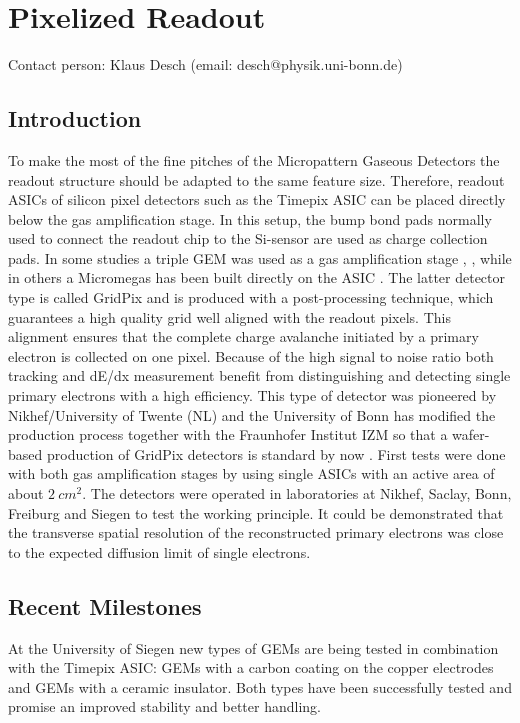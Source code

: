 \section{Pixelized Readout}\label{chap:TPC_sec:pixels}
Contact person: Klaus Desch (email: desch@physik.uni-bonn.de)\\

\subsection{Introduction}
To make the most of the fine pitches of the Micropattern Gaseous Detectors the
readout structure should be adapted to the same feature size. Therefore,
readout ASICs of silicon pixel detectors such as the Timepix ASIC
\cite{Llopart2007485,Llopart2008106} can be placed directly below the gas amplification
stage. In this setup, the bump bond pads normally used to connect the readout
chip to the Si-sensor are used as charge collection pads. In some studies a
triple GEM was used as a gas amplification stage \cite{Bamberger:2006xp},
\cite{6359808}, while in others a Micromegas has been built
directly on the ASIC \cite{Chefdeville2006490}. The latter detector type is
 called GridPix and is produced with a post-processing technique, which
 guarantees a high quality grid well aligned with the readout pixels. This
 alignment ensures that the complete charge avalanche initiated by a primary
 electron is collected on one pixel. Because of the high signal to noise
 ratio both tracking and dE/dx measurement benefit from distinguishing and
 detecting single primary electrons with a high efficiency. This type of
 detector was pioneered by Nikhef/University of Twente (NL) and the University
 of Bonn has modified the
 production process together with the Fraunhofer Institut IZM so that a
 wafer-based production of GridPix detectors is standard by now
 \cite{Koppert2013245}. First tests were done with both
 gas amplification stages by using single ASICs with an active area of about $\SI{2}{cm^2}$. The detectors were operated in laboratories at Nikhef, Saclay, Bonn,
 Freiburg and Siegen to test the working principle. It could be demonstrated
 that the transverse spatial resolution of the reconstructed primary electrons
 was close to the expected diffusion limit of single electrons.


\subsection{Recent Milestones}
At the University of Siegen new types of GEMs are being tested in combination
with the Timepix ASIC: GEMs with a
carbon coating on the copper electrodes and GEMs with a ceramic
insulator. Both types have been successfully tested and promise an improved
stability and better handling.

